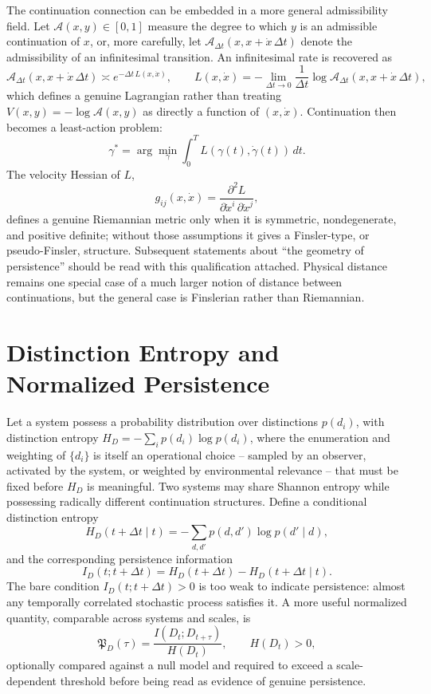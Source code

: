 \documentclass[11pt]{article}
\begin{document}
The continuation connection can be embedded in a more general admissibility field. Let $\mathcal{A}(x, y) \in [0,1]$ measure the degree to which $y$ is an admissible continuation of $x$, or, more carefully, let $\mathcal{A}_{\Delta t}(x, x + \dot x\, \Delta t)$ denote the admissibility of an infinitesimal transition. An infinitesimal rate is recovered as
\[
\mathcal{A}_{\Delta t}(x, x + \dot x\, \Delta t) \asymp e^{-\Delta t\, L(x, \dot x)}, \qquad L(x,\dot x) = -\lim_{\Delta t \to 0} \frac{1}{\Delta t} \log \mathcal{A}_{\Delta t}(x, x + \dot x\, \Delta t),
\]
which defines a genuine Lagrangian rather than treating $V(x,y) = -\log \mathcal{A}(x,y)$ as directly a function of $(x, \dot x)$. Continuation then becomes a least-action problem:
\[
\gamma^\ast = \arg\min_\gamma \int_0^T L(\gamma(t), \dot\gamma(t))\, dt.
\]
The velocity Hessian of $L$,
\[
g_{ij}(x, \dot x) = \frac{\partial^2 L}{\partial \dot x^i \, \partial \dot x^j},
\]
defines a genuine Riemannian metric only when it is symmetric, nondegenerate, and positive definite; without those assumptions it gives a Finsler-type, or pseudo-Finsler, structure. Subsequent statements about ``the geometry of persistence'' should be read with this qualification attached. Physical distance remains one special case of a much larger notion of distance between continuations, but the general case is Finslerian rather than Riemannian.

\section{Distinction Entropy and Normalized Persistence}

Let a system possess a probability distribution over distinctions $p(d_i)$, with distinction entropy $H_D = -\sum_i p(d_i) \log p(d_i)$, where the enumeration and weighting of $\{d_i\}$ is itself an operational choice -- sampled by an observer, activated by the system, or weighted by environmental relevance -- that must be fixed before $H_D$ is meaningful. Two systems may share Shannon entropy while possessing radically different continuation structures. Define a conditional distinction entropy
\[
H_D(t + \Delta t \mid t) = -\sum_{d, d'} p(d, d') \log p(d' \mid d),
\]
and the corresponding persistence information
\[
I_D(t; t+\Delta t) = H_D(t + \Delta t) - H_D(t + \Delta t \mid t).
\]
The bare condition $I_D(t; t+\Delta t) > 0$ is too weak to indicate persistence: almost any temporally correlated stochastic process satisfies it. A more useful normalized quantity, comparable across systems and scales, is
\[
\mathfrak{P}_D(\tau) = \frac{I(D_t; D_{t+\tau})}{H(D_t)}, \qquad H(D_t) > 0,
\]
optionally compared against a null model and required to exceed a scale-dependent threshold before being read as evidence of genuine persistence.
\end{document}
